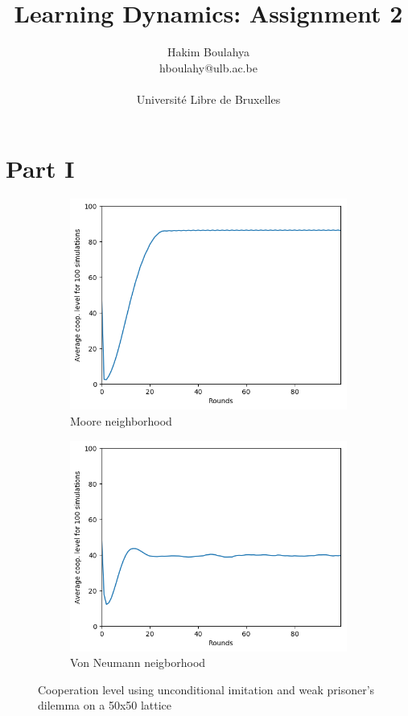 \documentclass[letterpaper]{article}
\title{Learning Dynamics: Assignment 2}
\author{\Large Hakim Boulahya \\
hboulahy@ulb.ac.be\\
\\
Université Libre de Bruxelles
}
\begin{document}
\maketitle
\tableofcontents
\newpage
\section{Part I}

\begin{figure}
    \begin{subfigure}{.5\textwidth}
        \centering
        \includegraphics[width=1\linewidth]{images/assign2/50-part1}
        \caption{Moore neighborhood}
        \label{fig:50moorepart1}
    \end{subfigure}
    \begin{subfigure}{.5\textwidth}
        \centering
        \includegraphics[width=1\linewidth]{images/assign2/50_vonneumann-part1}
        \caption{Von Neumann neigborhood}
        \label{fig:50vonpart1}
    \end{subfigure}
    \caption{Cooperation level using unconditional imitation and
    weak prisoner's dilemma on a 50x50 lattice}
    \label{fig:50part1}
\end{figure}
\end{document}
